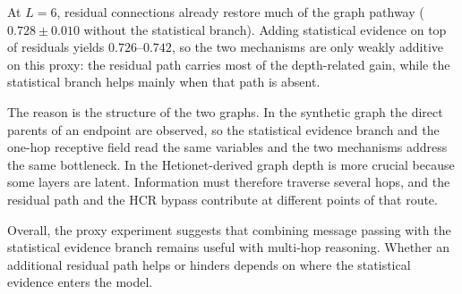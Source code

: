 At $L=6$, residual connections already restore much of the graph pathway
($0.728 \pm 0.010$ without the statistical branch).
Adding statistical evidence on top of residuals yields $0.726$--$0.742$, so the
two mechanisms are only weakly additive on this proxy: the residual path carries
most of the depth-related gain, while the statistical branch helps mainly when
that path is absent.

The reason is the structure of the two graphs. In the synthetic graph the direct
parents of an endpoint are observed, so the statistical evidence branch and the one-hop
receptive field read the same variables and the two mechanisms address the same
bottleneck. In the Hetionet-derived graph depth is more crucial because some
layers are latent. Information must
therefore traverse several hops, and the residual path and the HCR bypass
contribute at different points of that route.

Overall, the proxy experiment suggests that combining message passing
with the statistical evidence branch remains useful with 
multi-hop reasoning. Whether an
additional residual path helps or hinders depends on where 
the statistical
evidence enters the model.

